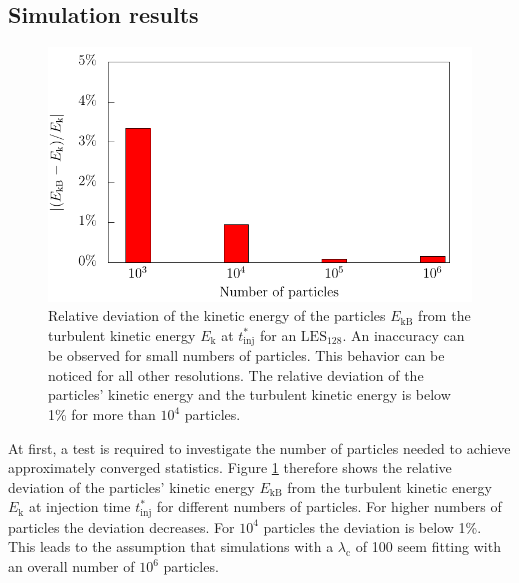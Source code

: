 \documentclass[11pt,a4paper,openany,oneside,parskip=half*]{article}
\begin{document}
\subsection{Simulation results}
\begin{figure}[h]
    \centering
    \begin{minipage}{0.5\textwidth}
        \centering
 	   \includegraphics[width=\linewidth]{./Abbildungen/kineticEnergy_numberOfParticles.pdf}
    \end{minipage}%
        \begin{minipage}{0.5\textwidth}
        \centering
        \caption{Relative deviation of the kinetic energy of the particles  $E_\mathrm{kB}$ from the turbulent kinetic energy $E_\mathrm{k}$ at $t^*_\mathrm{inj}$ for an $\mathrm{LES_{128}}$. An inaccuracy can be observed for small numbers of particles. This behavior can be noticed for all other resolutions. The relative deviation of the particles' kinetic energy and the turbulent kinetic energy is below 1\% for more than $10^4$ particles.}
	\label{kineticEnergy_numberofparticles}
    \end{minipage}
    \end{figure}
At first, a test is required to investigate the number of particles needed to achieve approximately converged statistics.
Figure \ref{kineticEnergy_numberofparticles} therefore shows the relative deviation of the particles' kinetic energy $E_\mathrm{kB}$ from the turbulent kinetic energy $E_\mathrm{k}$ at injection time $t^*_\mathrm{inj}$ for different numbers of particles. For higher numbers of particles the deviation decreases. For $10^4$ particles the deviation is below 1\%.
This leads to the assumption that simulations with a $\lambda_\mathrm{c}$ of 100 seem fitting with an overall number of $10^6$ particles. 
\end{document}
